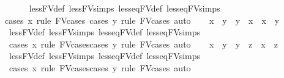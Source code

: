 \begin{isabellebody}
\ \ \ \ \isamarkupfalse%
\ less{\isacharunderscore}{\kern0pt}FV{\isacharunderscore}{\kern0pt}def\ less{\isacharunderscore}{\kern0pt}FV{\isachardot}{\kern0pt}simps\ less{\isacharunderscore}{\kern0pt}eq{\isacharunderscore}{\kern0pt}FV{\isacharunderscore}{\kern0pt}def\ less{\isacharunderscore}{\kern0pt}eq{\isacharunderscore}{\kern0pt}FV{\isachardot}{\kern0pt}simps\ \isanewline
\ \ \ \ \isamarkupfalse%
{\isacharparenleft}{\kern0pt}cases\ x\ rule{\isacharcolon}{\kern0pt}\ FV{\isacharunderscore}{\kern0pt}cases{\isacharparenright}{\kern0pt}\ {\isacharparenleft}{\kern0pt}cases\ y\ rule{\isacharcolon}{\kern0pt}\ FV{\isacharunderscore}{\kern0pt}cases{\isacharcomma}{\kern0pt}\ auto{\isacharparenright}{\kern0pt}\isanewline
\ \ \isamarkupfalse%
\ {\isachardoublequoteopen}x\ {\isasymle}\ y\ {\isasymLongrightarrow}\ y\ {\isasymle}\ x\ {\isasymLongrightarrow}\ x\ {\isacharequal}{\kern0pt}\ y{\isachardoublequoteclose}\isanewline
\ \ \ \ \isamarkupfalse%
\ less{\isacharunderscore}{\kern0pt}FV{\isacharunderscore}{\kern0pt}def\ less{\isacharunderscore}{\kern0pt}FV{\isachardot}{\kern0pt}simps\ less{\isacharunderscore}{\kern0pt}eq{\isacharunderscore}{\kern0pt}FV{\isacharunderscore}{\kern0pt}def\ less{\isacharunderscore}{\kern0pt}eq{\isacharunderscore}{\kern0pt}FV{\isachardot}{\kern0pt}simps\ \isanewline
\ \ \ \ \isamarkupfalse%
\ {\isacharparenleft}{\kern0pt}cases\ x\ rule{\isacharcolon}{\kern0pt}\ FV{\isacharunderscore}{\kern0pt}cases{\isacharparenright}{\kern0pt}{\isacharparenleft}{\kern0pt}cases\ y\ rule{\isacharcolon}{\kern0pt}\ FV{\isacharunderscore}{\kern0pt}cases{\isacharcomma}{\kern0pt}\ auto{\isacharparenright}{\kern0pt}{\isacharplus}{\kern0pt}\isanewline
\ \ \isamarkupfalse%
\ {\isachardoublequoteopen}x\ {\isasymle}\ y\ {\isasymLongrightarrow}\ y\ {\isasymle}\ z\ {\isasymLongrightarrow}\ x\ {\isasymle}\ z{\isachardoublequoteclose}\isanewline
\ \ \ \ \isamarkupfalse%
\ less{\isacharunderscore}{\kern0pt}FV{\isacharunderscore}{\kern0pt}def\ less{\isacharunderscore}{\kern0pt}FV{\isachardot}{\kern0pt}simps\ less{\isacharunderscore}{\kern0pt}eq{\isacharunderscore}{\kern0pt}FV{\isacharunderscore}{\kern0pt}def\ less{\isacharunderscore}{\kern0pt}eq{\isacharunderscore}{\kern0pt}FV{\isachardot}{\kern0pt}simps\ \isanewline
\ \ \ \ \isamarkupfalse%
\ {\isacharparenleft}{\kern0pt}cases\ x\ rule{\isacharcolon}{\kern0pt}\ FV{\isacharunderscore}{\kern0pt}cases{\isacharparenright}{\kern0pt}{\isacharparenleft}{\kern0pt}cases\ y\ rule{\isacharcolon}{\kern0pt}\ FV{\isacharunderscore}{\kern0pt}cases{\isacharcomma}{\kern0pt}\ auto{\isacharparenright}{\kern0pt}{\isacharplus}{\kern0pt}\isanewline

\end{isabellebody}
